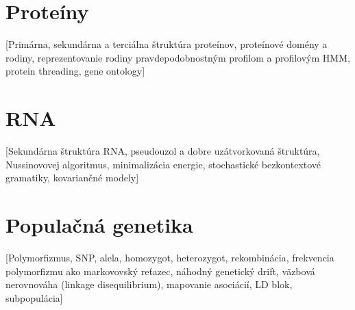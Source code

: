 	\section{Proteíny}

	[Primárna, sekundárna a terciálna štruktúra proteínov, proteínové domény a rodiny, reprezentovanie rodiny pravdepodobnostným profilom a profilovým HMM, protein threading, gene ontology]

	\section{RNA}

	[Sekundárna štruktúra RNA, pseudouzol a dobre uzátvorkovaná štruktúra, Nussinovovej algoritmus, minimalizácia energie, stochastické bezkontextové gramatiky, kovariančné modely]

	\section{Populačná genetika}

	[Polymorfizmus, SNP, alela, homozygot, heterozygot, rekombinácia, frekvencia polymorfizmu ako markovovský reťazec, náhodný genetický drift, väzbová nerovnováha (linkage disequilibrium), mapovanie asociácií, LD blok, subpopulácia]
